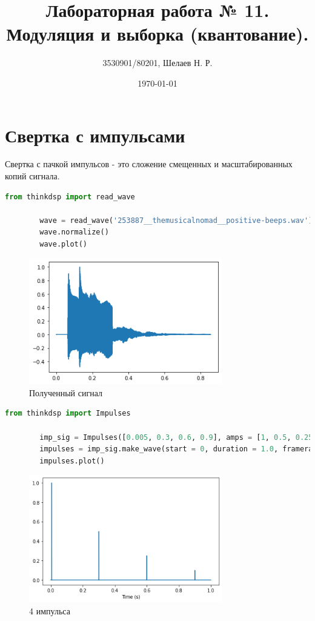 \documentclass[a4paper, 12pt]{report}
\author{3530901/80201, Шелаев Н. Р.}
\title{Лабораторная работа № 11. Модуляция и выборка (квантование).}
\date{\today}
\begin{document}
	\maketitle
	\tableofcontents
	\listoffigures
	\lstlistoflistings

	\chapter{Свертка с импульсами}
	Свертка с пачкой импульсов - это сложение смещенных и масштабированных копий сигнала.
	\begin{lstlisting}[language=Python,caption=Получение сигнала]
		from thinkdsp import read_wave

		wave = read_wave('253887__themusicalnomad__positive-beeps.wav')
		wave.normalize()
		wave.plot()
	\end{lstlisting}
	\begin{figure}[H]
		\centering
		\includegraphics[width=0.75\textwidth]{imp1.png}
		\caption{Полученный сигнал}
		\label{fig:imp1}
	\end{figure}
	\begin{lstlisting}[language=Python,caption=Последовательность из 4-х импульсов]
		from thinkdsp import Impulses

		imp_sig = Impulses([0.005, 0.3, 0.6, 0.9], amps = [1, 0.5, 0.25, 0.1])
		impulses = imp_sig.make_wave(start = 0, duration = 1.0, framerate = wave.framerate)
		impulses.plot()	
	\end{lstlisting}
	\begin{figure}[H]
		\centering
		\includegraphics[width=0.75\textwidth]{imp2.png}
		\caption{4 импульса}
		\label{fig:imp2}
	\end{figure}
\end{document}
